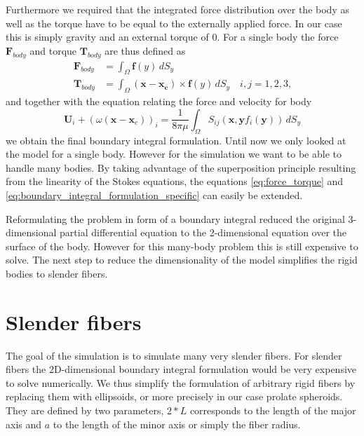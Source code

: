 \documentclass[a4paper,11pt]{kth-mag}
\begin{document}
Furthermore we required that the integrated force distribution over the body as well as the torque have to be equal to the externally applied force. In our case this is simply gravity and an external torque of $0$. For a single body the force $\mathbf{F}_{body}$ and torque $\mathbf{T}_{body}$ are thus defined as
\begin{equation}
  \label{eq:force_torque}
  \begin{aligned}
    \mathbf{F}_{body} &= \int_\Omega \mathbf{f}(y) \, dS_y \\
    \mathbf{T}_{body} &= \int_\Omega (\mathbf{x} - \mathbf{x_c}) \times \mathbf{f}(y) \, dS_y \quad i,j=1,2,3\text{,}
  \end{aligned}
\end{equation}
and together with the equation relating the force and velocity for body
\begin{equation}
  \label{eq:boundary_integral_formulation_specific}
  \mathbf{U}_i + (\omega (\mathbf{x} - \mathbf{x}_c))_i = \frac{1}{8\pi\mu} \int_\Omega S_{ij}(\mathbf{x},\mathbf{y} f_i(\mathbf{y}))  \, dS_y
\end{equation}
we obtain the final boundary integral formulation. Until now we only looked at the model for a single body. However for the simulation we want to be able to handle many bodies. By taking advantage of the superposition principle resulting from the linearity of the Stokes equations, the equations \eqref{eq:force_torque} and \eqref{eq:boundary_integral_formulation_specific} can easily be extended.

Reformulating the problem in form of a boundary integral reduced the original 3-dimensional partial differential equation to the 2-dimensional equation over the surface of the body. However for this many-body problem this is still expensive to solve. The next step to reduce the dimensionality of the model simplifies the rigid bodies to slender fibers.

\section{Slender fibers}

The goal of the simulation is to simulate many very slender fibers. For slender fibers the 2D-dimensional boundary integral formulation would be very expensive to solve numerically. We thus simplify the formulation of arbitrary rigid fibers by replacing them with ellipsoids, or more precisely in our case prolate spheroids. They are defined by two parameters, $2*L$ corresponds to the length of the major axis and $a$ to the length of the minor axis or simply the fiber radius.
\end{document}
